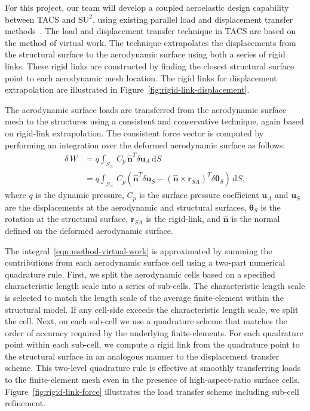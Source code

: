 \documentclass[]{aiaa-tc}
\newcommand{\mb}{\mathbf}
\newcommand{\mbs}{\boldsymbol}
\begin{document}
For this project, our team will develop a coupled aeroelastic design
capability between TACS and $\text{SU}^2$, using existing parallel
load and displacement transfer
methods~\cite{Kennedy:2014:tacs-tripan}. The load and displacement
transfer technique in TACS are based on the method of virtual
work. The technique extrapolates the displacements from the structural
surface to the aerodynamic surface using both a series of rigid
links. These rigid links are constructed by finding the closest
structural surface point to each aerodynamic mesh location. The rigid
links for displacement extrapolation are illustrated in
Figure~\ref{fig:rigid-link-displacement}.

The aerodynamic surface loads are transferred from the aerodynamic
surface mesh to the structures using a consistent and conservative
technique, again based on rigid-link extrapolation.  The consistent
force vector is computed by performing an integration over the
deformed aerodynamic surface as follows:
\begin{equation}
  \begin{aligned}
    \delta\, W & = q \int_{S_{A}} \, C_{p} \, \hat{\mb{n}}^{T} \delta\mb{u}_{A} \, \mathrm{d}S \\
    & = q\int_{S_{A}} \, C_{p} \left( \hat{\mb{n}}^{T} \delta \mathbf{u}_{S} -
    \left( \hat{\mb{n}}\times \mb{r}_{SA} \right)^{T} \delta \mbs{\theta}_{S} \right) \, \mathrm{d}S,
  \end{aligned}
  \label{eqn:method-virtual-work}
\end{equation}
where $q$ is the dynamic pressure, $C_{p}$ is the surface pressure
coefficient $\mb{u}_{A}$ and $\mb{u}_{S}$ are the displacements at the
aerodynamic and structural surfaces, $\mbs{\theta}_{S}$ is the
rotation at the structural surface, $\mb{r}_{SA}$ is the rigid-link,
and $\hat{\mb{n}}$ is the normal defined on the deformed aerodynamic
surface.

The integral~\eqref{eqn:method-virtual-work} is approximated by
summing the contributions from each aerodynamic surface cell using a
two-part numerical quadrature rule. First, we split the aerodynamic
cells based on a specified characteristic length scale into a series
of sub-cells. The characteristic length scale is selected to match the
length scale of the average finite-element within the structural
model. If any cell-side exceeds the characteristic length scale, we
split the cell. Next, on each sub-cell we use a quadrature scheme that
matches the order of accuracy required by the underlying
finite-elements. For each quadrature point within each sub-cell, we
compute a rigid link from the quadrature point to the structural
surface in an analogous manner to the displacement transfer
scheme. This two-level quadrature rule is effective at smoothly
transferring loads to the finite-element mesh even in the presence of
high-aspect-ratio surface cells. Figure~\ref{fig:rigid-link-force}
illustrates the load transfer scheme including sub-cell refinement.
\end{document}
